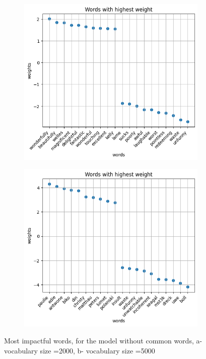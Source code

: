 \documentclass[eng]{class}
\begin{document}
\begin{figure}
  \centering
  \begin{subfigure}{.6\linewidth}
    \centering
    \includegraphics[width=.8\columnwidth]{images/words.png}
    \caption{}
    \label{fig:sub1}
  \end{subfigure}%
  \begin{subfigure}{.6\linewidth}
    \centering
    \includegraphics[width=.8\columnwidth]{images/words5000.png}
    \caption{}
    \label{fig:sub2}
  \end{subfigure}
  \caption{Most impactful words, for the model without common words, a- vocabulary size =2000, b- vocabulary size =5000}
  \label{fig-2}
\end{figure}
\end{document}
